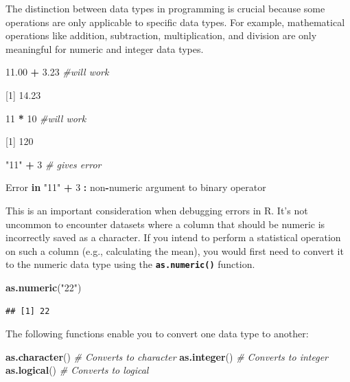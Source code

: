\documentclass[
]{book}
\newenvironment{Shaded}{\begin{snugshade}}{\end{snugshade}}
\newcommand{\CommentTok}[1]{\textcolor[rgb]{0.56,0.35,0.01}{\textit{#1}}}
\newcommand{\ControlFlowTok}[1]{\textcolor[rgb]{0.13,0.29,0.53}{\textbf{#1}}}
\newcommand{\DecValTok}[1]{\textcolor[rgb]{0.00,0.00,0.81}{#1}}
\newcommand{\FloatTok}[1]{\textcolor[rgb]{0.00,0.00,0.81}{#1}}
\newcommand{\FunctionTok}[1]{\textcolor[rgb]{0.13,0.29,0.53}{\textbf{#1}}}
\newcommand{\NormalTok}[1]{#1}
\newcommand{\SpecialCharTok}[1]{\textcolor[rgb]{0.81,0.36,0.00}{\textbf{#1}}}
\newcommand{\StringTok}[1]{\textcolor[rgb]{0.31,0.60,0.02}{#1}}
\begin{document}
The distinction between data types in programming is crucial because some operations are only applicable to specific data types. For example, mathematical operations like addition, subtraction, multiplication, and division are only meaningful for numeric and integer data types.

\begin{Shaded}
\begin{Highlighting}[]
\FloatTok{11.00} \SpecialCharTok{+} \FloatTok{3.23} \CommentTok{\#will work}

\NormalTok{[}\DecValTok{1}\NormalTok{] }\FloatTok{14.23}


\DecValTok{11} \SpecialCharTok{*} \DecValTok{10} \CommentTok{\#will work}

\NormalTok{[}\DecValTok{1}\NormalTok{] }\DecValTok{120}

\StringTok{"11"} \SpecialCharTok{+} \DecValTok{3} \CommentTok{\# gives error}

\NormalTok{Error }\ControlFlowTok{in} \StringTok{"11"} \SpecialCharTok{+} \DecValTok{3} \SpecialCharTok{:}\NormalTok{ non}\SpecialCharTok{{-}}\NormalTok{numeric argument to binary operator}
\end{Highlighting}
\end{Shaded}

This is an important consideration when debugging errors in R. It's not uncommon to encounter datasets where a column that should be numeric is incorrectly saved as a character. If you intend to perform a statistical operation on such a column (e.g., calculating the mean), you would first need to convert it to the numeric data type using the \textbf{\texttt{as.numeric()}} function.

\begin{Shaded}
\begin{Highlighting}[]
\FunctionTok{as.numeric}\NormalTok{(}\StringTok{"22"}\NormalTok{)}
\end{Highlighting}
\end{Shaded}

\begin{verbatim}
## [1] 22
\end{verbatim}

The following functions enable you to convert one data type to another:

\begin{Shaded}
\begin{Highlighting}[]
\FunctionTok{as.character}\NormalTok{()  }\CommentTok{\# Converts to character}
\FunctionTok{as.integer}\NormalTok{()    }\CommentTok{\# Converts to integer}
\FunctionTok{as.logical}\NormalTok{()    }\CommentTok{\# Converts to logical}
\end{Highlighting}
\end{Shaded}
\end{document}
